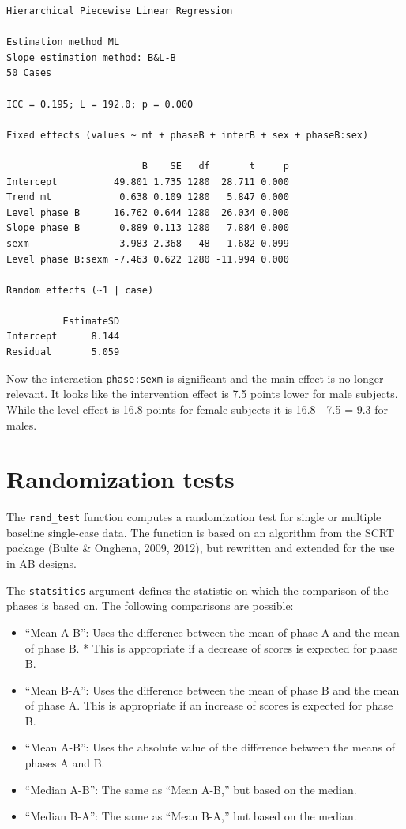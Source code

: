\documentclass[
]{book}
\providecommand{\tightlist}{%
  \setlength{\itemsep}{0pt}\setlength{\parskip}{0pt}}
\begin{document}
\begin{verbatim}
Hierarchical Piecewise Linear Regression

Estimation method ML 
Slope estimation method: B&L-B 
50 Cases

ICC = 0.195; L = 192.0; p = 0.000

Fixed effects (values ~ mt + phaseB + interB + sex + phaseB:sex)

                        B    SE   df       t     p
Intercept          49.801 1.735 1280  28.711 0.000
Trend mt            0.638 0.109 1280   5.847 0.000
Level phase B      16.762 0.644 1280  26.034 0.000
Slope phase B       0.889 0.113 1280   7.884 0.000
sexm                3.983 2.368   48   1.682 0.099
Level phase B:sexm -7.463 0.622 1280 -11.994 0.000

Random effects (~1 | case)

          EstimateSD
Intercept      8.144
Residual       5.059
\end{verbatim}

Now the interaction \texttt{phase:sexm} is significant and the main effect is no longer relevant. It looks like the intervention effect is 7.5 points lower for male subjects. While the level-effect is 16.8 points for female subjects it is 16.8 - 7.5 = 9.3 for males.

\hypertarget{randomization-tests}{%
\chapter{Randomization tests}\label{randomization-tests}}

The \texttt{rand\_test} function computes a randomization test for single or multiple baseline single-case data. The function is based on an algorithm from the SCRT package (Bulte \& Onghena, 2009, 2012), but rewritten and extended for the use in AB designs.

The \texttt{statsitics} argument defines the statistic on which the comparison of the phases is based on. The following comparisons are possible:

\begin{itemize}
\tightlist
\item
  ``Mean A-B'': Uses the difference between the mean of phase A and the mean of phase B. * This is appropriate if a decrease of scores is expected for phase B.
\item
  ``Mean B-A'': Uses the difference between the mean of phase B and the mean of phase A. This is appropriate if an increase of scores is expected for phase B.
\item
  ``Mean \textbar A-B\textbar{}'': Uses the absolute value of the difference between the means of phases A and B.
\item
  ``Median A-B'': The same as ``Mean A-B,'' but based on the median.
\item
  ``Median B-A'': The same as ``Mean B-A,'' but based on the median.
\end{itemize}
\end{document}
